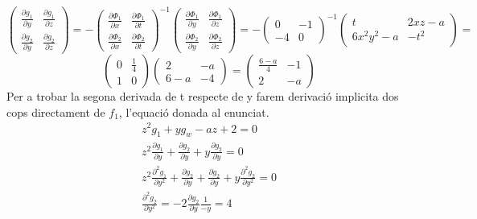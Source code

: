 \documentclass[12pt, a4papre]{article}
\begin{document}
	\[
	\begin{pmatrix}
		\frac{\partial g_1}{\partial y} 	&\frac{\partial g_1}{\partial z}\\
		\frac{\partial g_2}{\partial y} 	&\frac{\partial g_2}{\partial z}
	\end{pmatrix}
	=
	-
	\begin{pmatrix}
		\frac{\partial \Phi_1}{\partial x} 	&\frac{\partial \Phi_1}{\partial t}\\
		\frac{\partial \Phi_2}{\partial x} 	&\frac{\partial \Phi_2}{\partial t}
	\end{pmatrix}^{-1}
	\begin{pmatrix}
		\frac{\partial \Phi_1}{\partial y} 	&\frac{\partial \Phi_1}{\partial z}\\
		\frac{\partial \Phi_2}{\partial y} 	&\frac{\partial \Phi_2}{\partial z}
	\end{pmatrix}
	=
	-
	\begin{pmatrix}
		0	&-1\\
		-4	&0
	\end{pmatrix}^{-1}
	\begin{pmatrix}
		t		&2xz-a\\
		6x^2y^2-a	&-t^2
	\end{pmatrix}
	=
	\]
	\[
	\begin{pmatrix}
		0	&\frac{1}{4}\\
		1	&0
	\end{pmatrix}
	\begin{pmatrix}
		2	&-a\\
		6-a	&-4
	\end{pmatrix}
	=
	\begin{pmatrix}
		\frac{	6-a}{4}	&-1\\
		2	&-a
	\end{pmatrix}
	\]
	\newpage
	Per a trobar la segona derivada de t respecte de y farem derivació implicita dos cops directament de $f_1$, l'equació donada al enunciat.
	\begin{equation}
	\begin{split}
	z^2g_1+yg_w-az+2=0\\
	z^2\frac{\partial g_1}{\partial y}+\frac{\partial g_2}{\partial y}+y\frac{\partial g_2}{\partial y}=0\\
	z^2\frac{\partial^2 g_1}{\partial y^2}+\frac{\partial g_2}{\partial y}+\frac{\partial g_2}{\partial y}+y\frac{\partial^2 g_2}{\partial y^2}=0\\
	\frac{\partial^2 g_2}{\partial y^2}=-2\frac{\partial g_2}{\partial y}\frac{1}{-y}=4
	\end{split}
	\end{equation}
	
\end{document}
